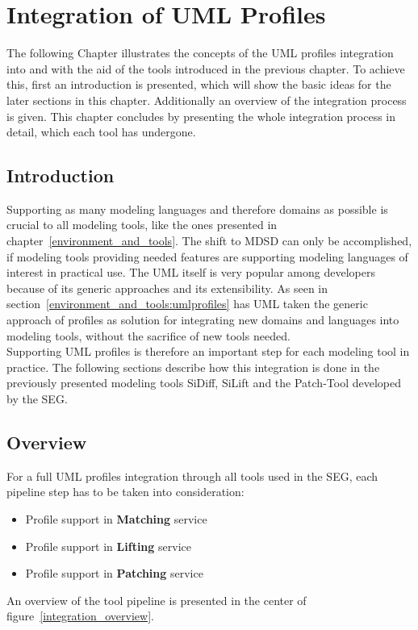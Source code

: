 \chapter{Integration of UML Profiles}\label{integration}
The following Chapter illustrates the concepts of the \ac{UML}
profiles integration into and with the aid of the tools introduced in the
previous chapter.
To achieve this, first an introduction is presented, which will show the basic 
ideas for the later sections in this chapter. Additionally an overview of
the integration process is given. This chapter concludes by presenting
the whole integration process in detail, which each tool has undergone.
\section{Introduction}\label{Integration:introduction}
Supporting as many modeling languages and therefore domains as possible is
crucial to all modeling tools, like the ones presented in chapter~\ref{environment_and_tools}.
The shift to \ac{MDSD} can only be accomplished, if modeling tools providing
needed features are supporting modeling languages of interest in practical use.
The \ac{UML} itself is very popular among developers because of its generic
approaches and its extensibility. As seen in
section~\ref{environment_and_tools:umlprofiles} has \ac{UML} taken the generic
approach of profiles as solution for integrating new domains and languages
into modeling tools, without the sacrifice of new tools needed.\\
Supporting \ac{UML} profiles is therefore an important step for each modeling
tool in practice. The following sections describe how this integration is done
in the previously presented modeling tools SiDiff, SiLift and the
Patch-Tool developed by the \ac{SEG}.
\section{Overview}\label{Integration:overview}
For a full \ac{UML} profiles integration through all tools used in the \ac{SEG},
each pipeline step has to be taken into consideration:
\begin{itemize}
  \item Profile support in \textbf{Matching} service
  \item Profile support in \textbf{Lifting} service
  \item Profile support in \textbf{Patching} service
\end{itemize}
An overview of the tool pipeline is presented in
the center of figure~\ref{integration_overview}.

